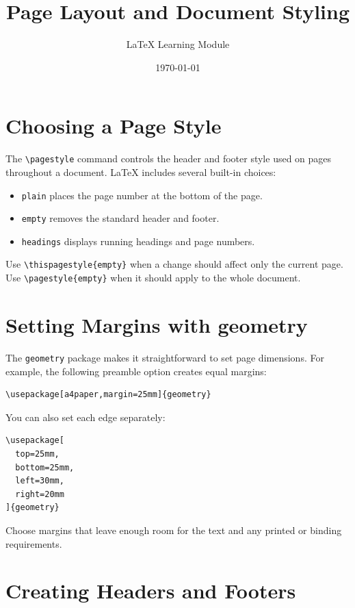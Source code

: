 \documentclass[12pt,a4paper]{article}
\title{\textbf{Page Layout and Document Styling}}
\author{LaTeX Learning Module}
\date{\today}
\begin{document}
\maketitle
\thispagestyle{plain}

\section{Choosing a Page Style}

The \verb|\pagestyle| command controls the header and footer style used on
pages throughout a document. LaTeX includes several built-in choices:

\begin{itemize}
    \item \texttt{plain} places the page number at the bottom of the page.
    \item \texttt{empty} removes the standard header and footer.
    \item \texttt{headings} displays running headings and page numbers.
\end{itemize}

Use \verb|\thispagestyle{empty}| when a change should affect only the current
page. Use \verb|\pagestyle{empty}| when it should apply to the whole document.

\section{Setting Margins with geometry}

The \texttt{geometry} package makes it straightforward to set page dimensions.
For example, the following preamble option creates equal margins:

\begin{verbatim}
\usepackage[a4paper,margin=25mm]{geometry}
\end{verbatim}

You can also set each edge separately:

\begin{verbatim}
\usepackage[
  top=25mm,
  bottom=25mm,
  left=30mm,
  right=20mm
]{geometry}
\end{verbatim}

Choose margins that leave enough room for the text and any printed or binding
requirements.

\section{Creating Headers and Footers}
\end{document}
